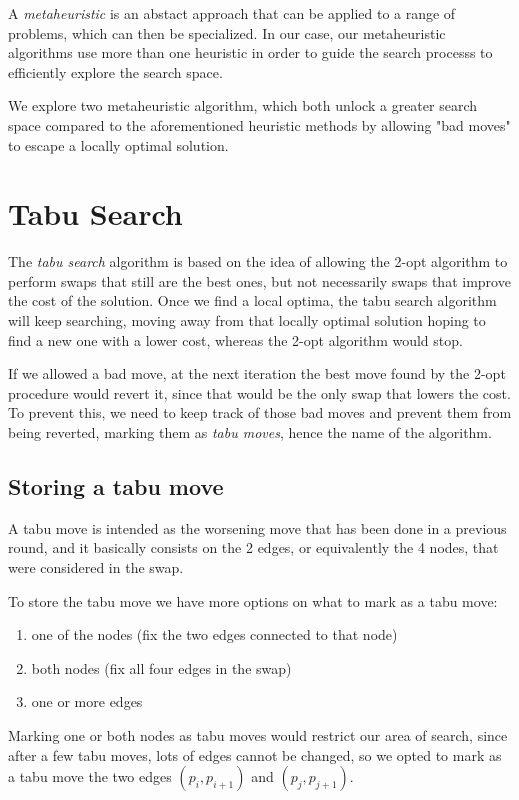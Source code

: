 A \textit{metaheuristic} is an abstact approach that can be applied to a range of problems, which can then be specialized. In our case, our metaheuristic algorithms use more than one heuristic in order to guide the search processs to efficiently explore the search space.

We explore two metaheuristic algorithm, which both unlock a greater search space compared to the aforementioned heuristic methods by allowing "bad moves" to escape a locally optimal solution.

\section{Tabu Search}
The \textit{tabu search} algorithm \cite{Glover1990} is based on the idea of allowing the 2-opt algorithm to perform swaps that still are the best ones, but not necessarily swaps that improve the cost of the solution. Once we find a local optima, the tabu search algorithm will keep searching, moving away from that locally optimal solution hoping to find a new one with a lower cost, whereas the 2-opt algorithm would stop.

If we allowed a bad move, at the next iteration the best move found by the 2-opt procedure would revert it, since that would be the only swap that lowers the cost. To prevent this, we need to keep track of those bad moves and prevent them from being reverted, marking them as \textit{tabu moves}, hence the name of the algorithm.

\subsection{Storing a tabu move}

A tabu move is intended as the worsening move that has been done in a previous round, and it basically consists on the 2 edges, or equivalently the 4 nodes, that were considered in the swap.

To store the tabu move we have more options on what to mark as a tabu move:

\begin{enumerate}
    \item one of the nodes (fix the two edges connected to that node)
    \item both nodes (fix all four edges in the swap)
    \item one or more edges
\end{enumerate}

Marking one or both nodes as tabu moves would restrict our area of search, since after a few tabu moves, lots of edges cannot be changed, so we opted to mark as a tabu move the two edges $(p_{i},p_{i+1})$ and $(p_{j}, p_{j+1})$.

